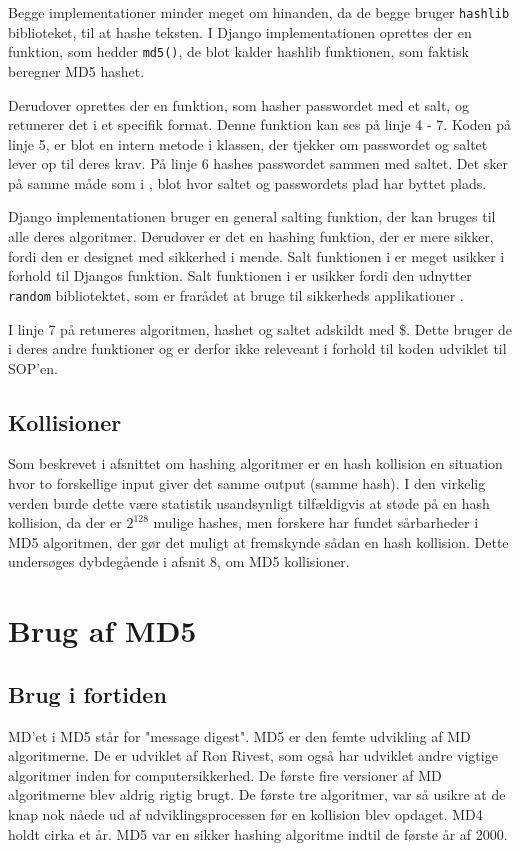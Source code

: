 \documentclass[12pt]{article}
\begin{document}
Begge implementationer minder meget om hinanden, da de begge bruger \verb|hashlib| biblioteket, til at hashe teksten. I Django implementationen oprettes der en funktion, som hedder \verb|md5()|, de blot kalder hashlib funktionen, som faktisk beregner MD5 hashet. 

Derudover oprettes der en funktion, som hasher passwordet med et salt, og retunerer det i et specifik format. Denne funktion kan ses på \figureautorefname{~\ref{code:django-md5}} linje 4 - 7. Koden på linje 5, er blot en intern metode i klassen, der tjekker om passwordet og saltet lever op til deres krav. På linje 6 hashes passwordet sammen med saltet. Det sker på samme måde som i \figureautorefname{~\ref{code:django-comp-code}}, blot hvor saltet og passwordets plad har byttet plads. 

Django implementationen bruger en general salting funktion, der kan bruges til alle deres algoritmer. Derudover er det en hashing funktion, der er mere sikker, fordi den er designet med sikkerhed i mende. Salt funktionen i \figureautorefname{~\ref{code:django-comp-code}} er meget usikker i forhold til Djangos funktion. Salt funktionen i \figureautorefname{~\ref{code:django-comp-code}} er usikker fordi den udnytter \verb|random| bibliotektet, som er frarådet at bruge til sikkerheds applikationer \cite{noauthor_random_nodate}.

I linje 7 på \figureautorefname{~\ref{code:django-md5}} retuneres algoritmen, hashet og saltet adskildt med \$. Dette bruger de i deres andre funktioner og er derfor ikke releveant i forhold til koden udviklet til SOP'en. 

\subsection{Kollisioner}
Som beskrevet i afsnittet om hashing algoritmer er en hash kollision en situation hvor to forskellige input giver det samme output (samme hash). I den virkelig verden burde dette være statistik usandsynligt tilfældigvis at støde på en hash kollision, da der er $2^{128}$ mulige hashes, men forskere har fundet sårbarheder i MD5 algoritmen, der gør det muligt at fremskynde sådan en hash kollision. Dette undersøges dybdegående i afsnit 8, om MD5 kollisioner. 


\section{Brug af MD5}
\subsection{Brug i fortiden}
MD'et i MD5 står for "message digest". MD5 er den femte udvikling af MD algoritmerne. De er udviklet af Ron Rivest, som også har udviklet andre vigtige algoritmer inden for computersikkerhed. De første fire versioner af MD algoritmerne blev aldrig rigtig brugt. De første tre algoritmer, var så usikre at de knap nok nåede ud af udviklingsprocessen før en kollision blev opdaget. MD4 holdt cirka et år. MD5 var en sikker hashing algoritme indtil de første år af 2000. \cite{lake_what_2021}
\end{document}
